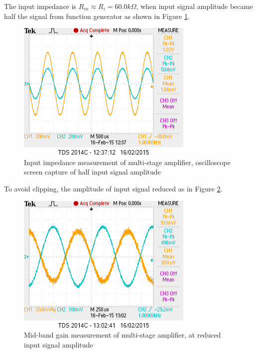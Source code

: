 \documentclass[a4paper,notitlepage,10pt]{report}
\begin{document}
\begin{multicols}{2}
The input impedance is $R_{in} \approx R_i = 60.0k\Omega$, when input signal amplitude became half the signal from function generator as shown in Figure \ref{fig:lab_multi_rin}.
\parskip=0pt

\begin{figure}[H]
	\centering
	\includegraphics[width=0.85\columnwidth]{labmultirin}
	\caption{Input impedance measurement of multi-stage amplifier, oscilloscope screen capture of half input signal amplitude}
	\label{fig:lab_multi_rin}
\end{figure}
\parskip=6pt

To avoid clipping, the amplitude of input signal reduced as in Figure \ref{fig:lab_multi_gain_small}.
\parskip=0pt

\begin{figure}[H]
	\centering
	\includegraphics[width=0.85\columnwidth]{labmultigainsmall}
	\caption{Mid-band gain measurement of multi-stage amplifier, at reduced input signal amplitude}
	\label{fig:lab_multi_gain_small}
\end{figure}
\parskip=6pt


\end{multicols}
\end{document}
